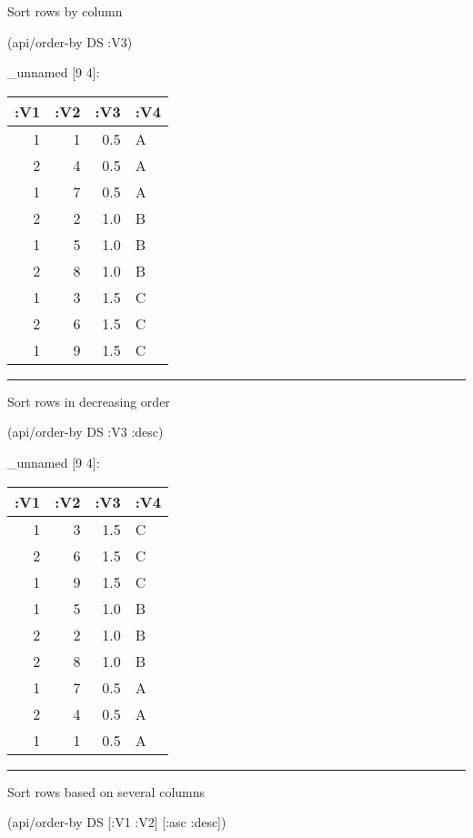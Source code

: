\documentclass[]{article}
\newenvironment{Shaded}{\begin{snugshade}}{\end{snugshade}}
\newcommand{\AttributeTok}[1]{\textcolor[rgb]{0.77,0.63,0.00}{#1}}
\newcommand{\NormalTok}[1]{#1}
\begin{document}
Sort rows by column

\begin{Shaded}
\begin{Highlighting}[]
\NormalTok{(api/order-by DS }\AttributeTok{:V3}\NormalTok{)}
\end{Highlighting}
\end{Shaded}

\_unnamed {[}9 4{]}:

\begin{longtable}[]{@{}rrrl@{}}
\toprule
:V1 & :V2 & :V3 & :V4\tabularnewline
\midrule
\endhead
1 & 1 & 0.5 & A\tabularnewline
2 & 4 & 0.5 & A\tabularnewline
1 & 7 & 0.5 & A\tabularnewline
2 & 2 & 1.0 & B\tabularnewline
1 & 5 & 1.0 & B\tabularnewline
2 & 8 & 1.0 & B\tabularnewline
1 & 3 & 1.5 & C\tabularnewline
2 & 6 & 1.5 & C\tabularnewline
1 & 9 & 1.5 & C\tabularnewline
\bottomrule
\end{longtable}

\begin{center}\rule{0.5\linewidth}{0.5pt}\end{center}

Sort rows in decreasing order

\begin{Shaded}
\begin{Highlighting}[]
\NormalTok{(api/order-by DS }\AttributeTok{:V3} \AttributeTok{:desc}\NormalTok{)}
\end{Highlighting}
\end{Shaded}

\_unnamed {[}9 4{]}:

\begin{longtable}[]{@{}rrrl@{}}
\toprule
:V1 & :V2 & :V3 & :V4\tabularnewline
\midrule
\endhead
1 & 3 & 1.5 & C\tabularnewline
2 & 6 & 1.5 & C\tabularnewline
1 & 9 & 1.5 & C\tabularnewline
1 & 5 & 1.0 & B\tabularnewline
2 & 2 & 1.0 & B\tabularnewline
2 & 8 & 1.0 & B\tabularnewline
1 & 7 & 0.5 & A\tabularnewline
2 & 4 & 0.5 & A\tabularnewline
1 & 1 & 0.5 & A\tabularnewline
\bottomrule
\end{longtable}

\begin{center}\rule{0.5\linewidth}{0.5pt}\end{center}

Sort rows based on several columns

\begin{Shaded}
\begin{Highlighting}[]
\NormalTok{(api/order-by DS [}\AttributeTok{:V1} \AttributeTok{:V2}\NormalTok{] [}\AttributeTok{:asc} \AttributeTok{:desc}\NormalTok{])}
\end{Highlighting}
\end{Shaded}
\end{document}
